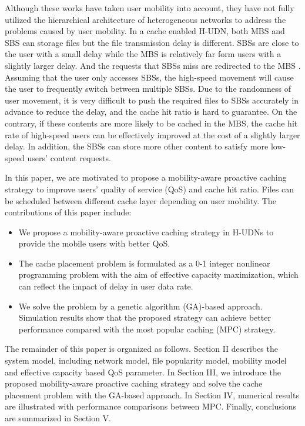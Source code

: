 \documentclass[conference]{IEEEtran}
\begin{document}
Although these works have taken user mobility into account, they have not fully utilized the hierarchical architecture of heterogeneous networks to address the problems caused by user mobility. In a cache enabled H-UDN, both MBS and SBS can storage files but the file transmission delay is different. SBSs are close to the user with a small delay while the MBS is relatively far form users with a slightly larger delay. And the requests that SBSs miss are redirected to the MBS \cite{7484297}. Assuming that the user only accesses SBSs, the high-speed movement will cause the user to frequently switch between multiple SBSs. Due to the randomness of user movement, it is very difficult to push the required files to SBSs accurately in advance to reduce the delay, and the cache hit ratio is hard to guarantee. On the contrary, if these contents are more likely to be cached in the MBS, the cache hit rate of high-speed users can be effectively improved at the cost of a slightly larger delay. In addition, the SBSs can store more other content to satisfy more low-speed users' content requests.

In this paper, we are motivated to propose a mobility-aware proactive caching strategy to improve users’ quality of service (QoS) and cache hit ratio. Files can be scheduled between different cache layer depending on user mobility. The contributions of this paper include:

\begin{itemize}
 \item We propose a mobility-aware proactive caching strategy in H-UDNs to provide the mobile users with better QoS.
 \item The cache placement problem is formulated as a 0-1 integer nonlinear programming problem with the aim of effective capacity maximization, which can reflect the impact of delay in user data rate.
 \item We solve the problem by a genetic algorithm (GA)-based approach. Simulation results show that the proposed strategy can achieve better performance compared with the most popular caching (MPC) strategy.
\end{itemize}

The remainder of this paper is organized as follows. Section II describes the system model, including network model, file popularity model, mobility model and effective capacity based QoS parameter. In Section III, we introduce the proposed mobility-aware proactive caching strategy and solve the cache placement problem with the GA-based approach. In Section IV, numerical results are illustrated with performance comparisons between MPC. Finally, conclusions are summarized in Section V.
\end{document}
